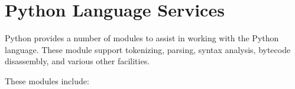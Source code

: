 \chapter{Python Language Services
         \label{language}}

Python provides a number of modules to assist in working with the
Python language.  These module support tokenizing, parsing, syntax
analysis, bytecode disassembly, and various other facilities.

These modules include:

\localmoduletable
